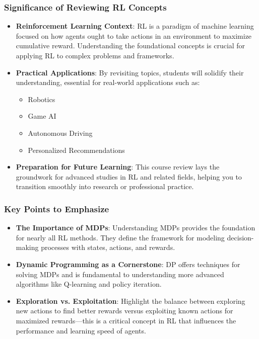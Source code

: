 \documentclass[aspectratio=169]{beamer}
\begin{document}
\begin{frame}[fragile]
    \frametitle{Significance of Reviewing RL Concepts}
    \begin{itemize}
        \item \textbf{Reinforcement Learning Context}: RL is a paradigm of machine learning focused on how agents ought to take actions in an environment to maximize cumulative reward. Understanding the foundational concepts is crucial for applying RL to complex problems and frameworks.
        
        \item \textbf{Practical Applications}: By revisiting topics, students will solidify their understanding, essential for real-world applications such as:
        \begin{itemize}
            \item Robotics
            \item Game AI
            \item Autonomous Driving
            \item Personalized Recommendations
        \end{itemize}
        
        \item \textbf{Preparation for Future Learning}: This course review lays the groundwork for advanced studies in RL and related fields, helping you to transition smoothly into research or professional practice.
    \end{itemize}
\end{frame}

\begin{frame}[fragile]
    \frametitle{Key Points to Emphasize}
    \begin{itemize}
        \item \textbf{The Importance of MDPs}: Understanding MDPs provides the foundation for nearly all RL methods. They define the framework for modeling decision-making processes with states, actions, and rewards.
        
        \item \textbf{Dynamic Programming as a Cornerstone}: DP offers techniques for solving MDPs and is fundamental to understanding more advanced algorithms like Q-learning and policy iteration.
        
        \item \textbf{Exploration vs. Exploitation}: Highlight the balance between exploring new actions to find better rewards versus exploiting known actions for maximized rewards—this is a critical concept in RL that influences the performance and learning speed of agents.
    \end{itemize}
\end{frame}
\end{document}
